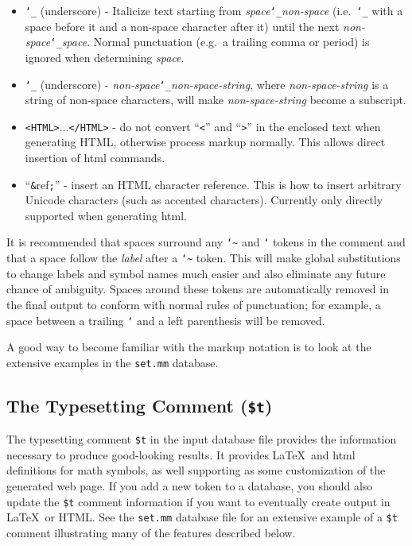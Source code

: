 \begin{itemize}
 \item[]
         \texttt{\char`\_} (underscore) -
             Italicize text starting from
              {\em space}\texttt{\char`\_}{\em non-space} (i.e.\ \texttt{\char`\_}
              with a space before it and a non-space character after it) until
             the next
             {\em non-space}\texttt{\char`\_}{\em space}.  Normal
             punctuation (e.g.\ a trailing
             comma or period) is ignored when determining {\em space}.
 \item[]
         \texttt{\char`\_} (underscore) - {\em
         non-space}\texttt{\char`\_}{\em non-space-string}, where
          {\em non-space-string} is a string of non-space characters,
         will make {\em non-space-string} become a subscript.
 \item[]
         \texttt{<HTML>}...\texttt{</HTML>} - do not convert
         ``\texttt{<}'' and ``\texttt{>}''
         in the enclosed text when generating HTML,
         otherwise process markup normally. This allows direct insertion
         of {\sc html} commands.
 \item[]
	 ``\texttt{\&}ref\texttt{;}'' - insert an HTML character reference.
         This is how to insert arbitrary Unicode characters
         (such as accented characters).  Currently only directly supported
         when generating {\sc html}.
\end{itemize}

It is recommended that spaces surround any \texttt{\char`\~} and
\texttt{`} tokens in the comment and that a space follow the {\em label}
after a \texttt{\char`\~} token.  This will make global substitutions
to change labels and symbol names much easier and also eliminate any
future chance of ambiguity.  Spaces around these tokens are automatically
removed in the final output to conform with normal rules of punctuation;
for example, a space between a trailing \texttt{`} and a left parenthesis
will be removed.

A good way to become familiar with the markup notation is to look at
the extensive examples in the \texttt{set.mm} database.

\subsection{The Typesetting Comment (\texttt{\$t})}\label{tcomment}

The typesetting comment \texttt{\$t} in the input database file
provides the information necessary to produce good-looking results.
It provides \LaTeX\ and {\sc html}
definitions for math symbols,
as well supporting as some
customization of the generated web page.
If you add a new token to a database, you should also
update the \texttt{\$t} comment information if you want to eventually
create output in \LaTeX\ or {\sc HTML}.
See the
\texttt{set.mm} database
file for an extensive example of a \texttt{\$t} comment illustrating
many of the features described below.

